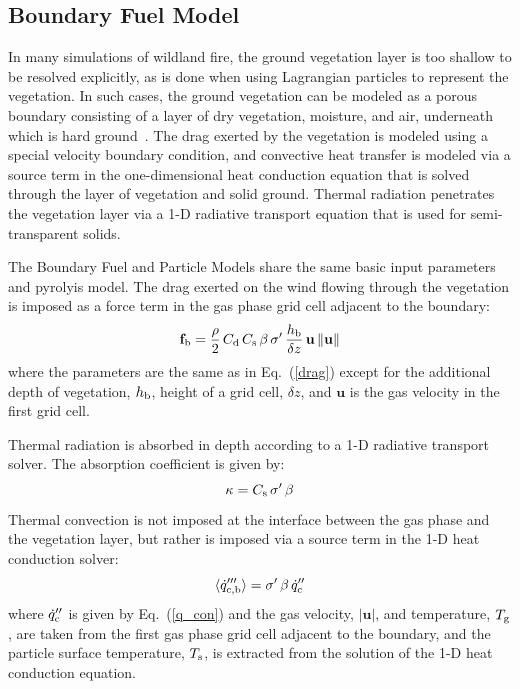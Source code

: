 \documentclass[journal,article,atmosphere,submit,moreauthors,pdftex]{Definitions/mdpi}
\begin{document}
\subsection{Boundary Fuel Model}

In many simulations of wildland fire, the ground vegetation layer is too shallow to be resolved explicitly, as is done when using Lagrangian particles to represent the vegetation. In such cases, the ground vegetation can be modeled as a porous boundary consisting of a layer of dry vegetation, moisture, and air, underneath which is hard ground~\cite{Perez-Ramirez:FT2017}. The drag exerted by the vegetation is modeled using a special velocity boundary condition, and convective heat transfer is modeled via a source term in the one-dimensional heat conduction equation that is solved through the layer of vegetation and solid ground. Thermal radiation penetrates the vegetation layer via a 1-D radiative transport equation that is used for semi-transparent solids.

The Boundary Fuel and Particle Models share the same basic input parameters and pyrolyis model. The drag exerted on the wind flowing through the vegetation is imposed as a force term in the gas phase grid cell adjacent to the boundary:
\begin{equation}
    \mathbf{f}_{\rm b} = \frac{\rho}{2} \, C_{\rm d} \, C_{\rm s} \, \beta \, \sigma' \, \frac{h_{\rm b}}{\delta z} \, \mathbf{u} \, \|\mathbf{u}\|
\end{equation}
where the parameters are the same as in Eq.~(\ref{drag}) except for the additional depth of vegetation, $h_{\rm b}$, height of a grid cell, $\delta z$, and $\mathbf{u}$ is the gas velocity in the first grid cell.

Thermal radiation is absorbed in depth according to a 1-D radiative transport solver. The absorption coefficient is given by:
\begin{equation}
   \kappa = C_{\rm s} \, \sigma' \, \beta
\end{equation}
Thermal convection is not imposed at the interface between the gas phase and the vegetation layer, but rather is imposed via a source term in the 1-D heat conduction solver:
\begin{equation}
   \langle \dot{q}_{\rm c,b}''' \rangle = \sigma' \, \beta \, \dot{q}_{\rm c}'' 
\end{equation}
where $\dot{q}_{\rm c}''$ is given by Eq.~(\ref{q_con}) and the gas velocity, $|\mathbf{u}|$, and temperature, $T_{\rm g}$, are taken from the first gas phase grid cell adjacent to the boundary, and the particle surface temperature, $T_{\rm s}$, is extracted from the solution of the 1-D heat conduction equation.
\end{document}
